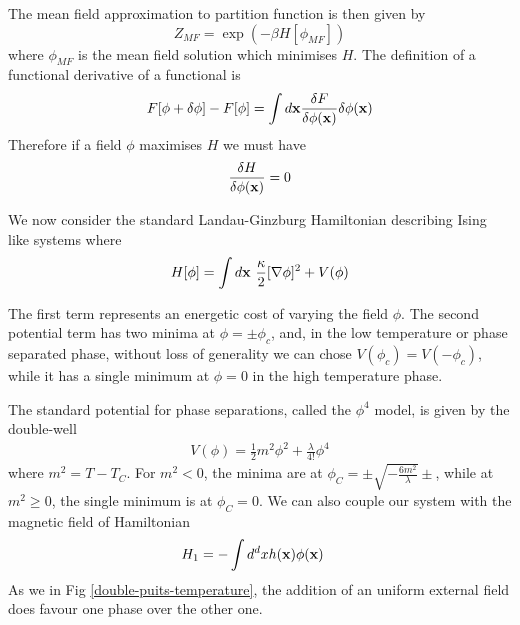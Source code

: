 The mean field approximation to partition function is then given by
\begin{equation}
    Z _{MF}=  \exp(-\beta H[\phi_{MF}])
\end{equation} 
where $\phi_{MF}$ is the mean field solution which minimises $H$. The definition of a functional derivative of a functional is
\begin{equation}
    F[\phi+\delta\phi]-F[\phi]= \int d{\bf x} \frac{\delta F}{\delta\phi({\bf x})} \delta\phi({\bf x})
\end{equation}
Therefore if a field $\phi$ maximises $H$ we must have 
\begin{equation}
    \frac{\delta H}{\delta\phi({\bf x})}=0
\end{equation}

We now consider the standard Landau-Ginzburg Hamiltonian  \cite{l_landau_physique_1990} describing Ising like systems where
\begin{equation}
    H[\phi] = \int d{\bf x} \ \frac{\kappa}{2}[\nabla \phi]^2 + V(\phi)
\end{equation}
{\color{blue}
The first term represents an energetic cost of varying the field $\phi$. The second potential term has two minima at $\phi=\pm \phi_c$, and, in the low temperature or phase separated phase, without loss of generality we can chose  $V(\phi_c)=V(-\phi_c)$, while it has a single minimum at $\phi=0$ in the high temperature phase.

The standard potential for phase separations, called the $\phi^4$ model, is given by the double-well
\begin{align}
    V(\phi) = \frac{1}{2} m^2 \phi^2 + \frac{\lambda}{4!} \phi^4
    \label{phi4}
\end{align} 
where $m^2 = T-T_C$. For $m^2 \less 0$, the minima are at $\phi_C = \pm \sqrt{- \frac{6 m^2}{\lambda} } \pm$, while at $m^2 \ge 0$, the single minimum is at $\phi_C = 0$. We can also couple our system with the magnetic field of Hamiltonian
\begin{align}
    H_1 &= - \int d^dx h({\bf x})\phi({\bf x})
    \label{champ-externe}
\end{align}
As we in Fig \ref{double-puits-temperature}, the addition of an uniform external field does favour one phase over the other one.
}

